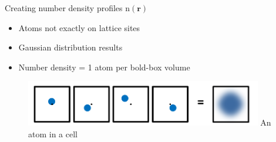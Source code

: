 \documentclass{beamer}
\renewcommand{\vec}[1]{\mathbf{#1}}
\begin{document}
\begin{frame}{Creating number density profiles $\text{n}(\vec r)$}
    \begin{itemize}
	    \item Atoms not exactly on lattice sites
		\item Gaussian distribution results
		\item Number density = 1 atom per bold-box volume
	\end{itemize}	
	
    \begin{figure}
       \centering
       \includegraphics[height=2cm]{Ensemble_Gaussian.png}
       \label{fig:Ensemble_Gaus}
        An atom in a cell
     \end{figure}     
\end{frame}	

       
    
\end{document}
